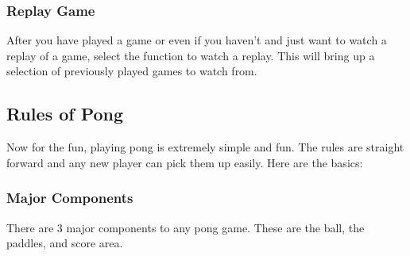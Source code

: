 \documentclass[12pt]{article}
\begin{document}
\subsubsection{Replay Game}
After you have played a game or even if you haven’t and just want to watch a replay of a game, select the function to watch a replay. This will bring up a selection of previously played games to watch from.
\subsection{Rules of Pong}
Now for the fun, playing pong is extremely simple and fun. The rules are straight forward and any new player can pick them up easily. Here are the basics:
\subsubsection {Major Components}
There are 3 major components to any pong game. These are the ball, the paddles, and score area. 
\end{document}
